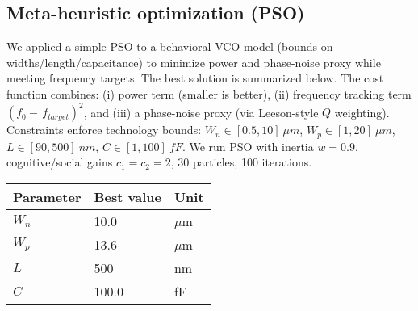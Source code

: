 \subsection*{Meta-heuristic optimization (PSO)}
We applied a simple PSO to a behavioral VCO model (bounds on widths/length/capacitance) to minimize power and phase-noise proxy while meeting frequency targets. The best solution is summarized below.
The cost function combines: (i) power term (smaller is better), (ii) frequency tracking term $(f_0-\,f_{target})^2$, and (iii) a phase-noise proxy (via Leeson-style $Q$ weighting). Constraints enforce technology bounds: $W_n\in[0.5,10]~\mu m$, $W_p\in[1,20]~\mu m$, $L\in[90,500]~nm$, $C\in[1,100]~fF$.
We run PSO with inertia $w=0.9$, cognitive/social gains $c_1=c_2=2$, 30 particles, 100 iterations.
\begin{table}[H]
  \centering
  \begin{tabular}{lll}
    \toprule
    Parameter & Best value & Unit \\
    \midrule
    $W_n$ & 10.0 & $\mu$m \\
    $W_p$ & 13.6 & $\mu$m \\
    $L$ & 500 & nm \\
    $C$ & 100.0 & fF \\
    \bottomrule
  \end{tabular}
\end{table}

